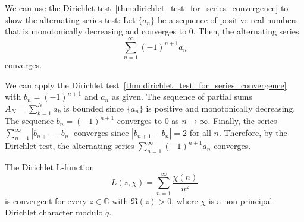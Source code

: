 \documentclass{elegantbook}
\begin{document}
\begin{example}
  We can use the Dirichlet test~\ref{thm:dirichlet_test_for_series_convergence} to show the alternating series test:
  Let $\{a_n\}$ be a sequence of positive real numbers that is monotonically decreasing and converges to $0$. Then, the alternating series
  \[
    \sum_{n=1}^{\infty} (-1)^{n+1} a_n
  \] converges.

  We can apply the Dirichlet test~\ref{thm:dirichlet_test_for_series_convergence} with $b_n = (-1)^{n+1}$ and $a_n$ as given. The sequence of partial sums $A_N = \sum_{k=1}^{N} a_k$ is bounded since $\{a_n\}$ is positive and monotonically decreasing. The sequence $b_n = (-1)^{n+1}$ converges to $0$ as $n \to \infty$. Finally, the series $\sum_{n=1}^{\infty} |b_{n+1} - b_n|$ converges since $|b_{n+1} - b_n| = 2$ for all $n$. Therefore, by the Dirichlet test, the alternating series $\sum_{n=1}^{\infty} (-1)^{n+1} a_n$ converges.
\end{example}

\begin{theorem} \label{thm:convergence_of_dirichlet_L_function_for_non_principal_characters}
  The Dirichlet L-function
  \[
    L(z,\chi) = \sum_{n=1}^{\infty} \frac{\chi(n)}{n^z}
  \]
  is convergent for every \(z\in\mathbb C\) with \(\Re(z)>0\), where \(\chi\) is a non-principal Dirichlet character modulo \(q\).
\end{theorem}
\end{document}
